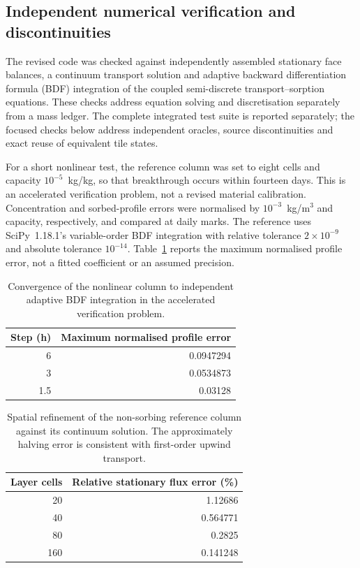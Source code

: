 \subsection{Independent numerical verification and discontinuities}
\label{sec:numerical_revision}

The revised code was checked against independently assembled stationary
face balances, a continuum transport solution and adaptive backward
differentiation formula (BDF) integration of the coupled semi-discrete
transport--sorption equations. These checks address equation solving and
discretisation separately from a mass ledger. The complete integrated test
suite is reported separately; the focused checks below address independent
oracles, source discontinuities and exact reuse of equivalent tile states.

For a short nonlinear test, the reference column was set to eight cells and
capacity $10^{-5}$~kg/kg, so that breakthrough occurs within fourteen days.
This is an accelerated verification problem, not a revised material
calibration. Concentration and sorbed-profile errors were normalised by
$10^{-3}$~kg/m$^3$ and capacity, respectively, and compared at daily marks.
The reference uses SciPy~1.18.1's variable-order BDF integration with relative
tolerance $2\times10^{-9}$ and absolute tolerance $10^{-14}$.\citep{scipy_solve_ivp}
Table~\ref{tab:independent-temporal} reports the maximum normalised
profile error, not a fitted coefficient or an assumed precision.


\begin{table}[htbp]\centering\small
\caption{Convergence of the nonlinear column to independent adaptive BDF integration in the accelerated verification problem.}\label{tab:independent-temporal}
\begin{tabular}{rr}\toprule
Step (h) & Maximum normalised profile error \\\midrule
6 & 0.0947294 \\
3 & 0.0534873 \\
1.5 & 0.03128 \\
\bottomrule\end{tabular}\end{table}


\begin{table}[htbp]\centering\small
\caption{Spatial refinement of the non-sorbing reference column against its continuum solution. The approximately halving error is consistent with first-order upwind transport.}\label{tab:independent-spatial}
\begin{tabular}{rr}\toprule
Layer cells & Relative stationary flux error (\%) \\\midrule
20 & 1.12686 \\
40 & 0.564771 \\
80 & 0.2825 \\
160 & 0.141248 \\
\bottomrule\end{tabular}\end{table}


